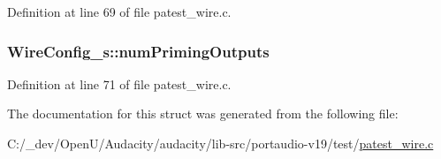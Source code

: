 Definition at line 69 of file patest\+\_\+wire.\+c.

\subsubsection[{\texorpdfstring{num\+Priming\+Outputs}{numPrimingOutputs}}]{ Wire\+Config\+\_\+s\+::num\+Priming\+Outputs}\hypertarget{struct_wire_config__s_a3f8f88c3fcf030c0e85569d071b23b91}{}\label{struct_wire_config__s_a3f8f88c3fcf030c0e85569d071b23b91}


Definition at line 71 of file patest\+\_\+wire.\+c.



The documentation for this struct was generated from the following file\+:\begin{DoxyCompactItemize}
\item 
C\+:/\+\_\+dev/\+Open\+U/\+Audacity/audacity/lib-\/src/portaudio-\/v19/test/\hyperlink{patest__wire_8c}{patest\+\_\+wire.\+c}\end{DoxyCompactItemize}
